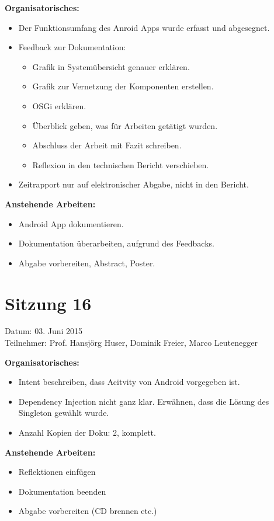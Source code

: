 	\textbf{Organisatorisches:}
	\begin{itemize}
		\item Der Funktionsumfang des Anroid Apps wurde erfasst und abgesegnet.
		\item Feedback zur Dokumentation:
		\begin{itemize}
			\item Grafik in Systemübersicht genauer erklären.
			\item Grafik zur Vernetzung der Komponenten erstellen.
			\item OSGi erklären.
			\item Überblick geben, was für Arbeiten getätigt wurden.
			\item Abschluss der Arbeit mit Fazit schreiben.
			\item Reflexion in den technischen Bericht verschieben.
		\end{itemize}
		\item Zeitrapport nur auf elektronischer Abgabe, nicht in den Bericht.
	\end{itemize}

	\textbf{Anstehende Arbeiten:}
	\begin{itemize}
		\item Android App dokumentieren.
		\item Dokumentation überarbeiten, aufgrund des Feedbacks.
		\item Abgabe vorbereiten, Abstract, Poster.
	\end{itemize}

\section*{Sitzung 16}
	Datum: 03. Juni 2015 \\
	Teilnehmer: Prof. Hansjörg Huser, Dominik Freier, Marco Leutenegger

	\textbf{Organisatorisches:}
	\begin{itemize}
		\item Intent beschreiben, dass Acitvity von Android vorgegeben ist.
		\item Dependency Injection nicht ganz klar. Erwähnen, dass die Lösung des Singleton gewählt wurde.
		\item Anzahl Kopien der Doku: 2, komplett.
	\end{itemize}

	\textbf{Anstehende Arbeiten:}
	\begin{itemize}
		\item Reflektionen einfügen
		\item Dokumentation beenden
		\item Abgabe vorbereiten (CD brennen etc.)
	\end{itemize}
	
	
	
	
	
	
	
	
	
	
	
	
	
	
	
	
	
	
	
	
	
	